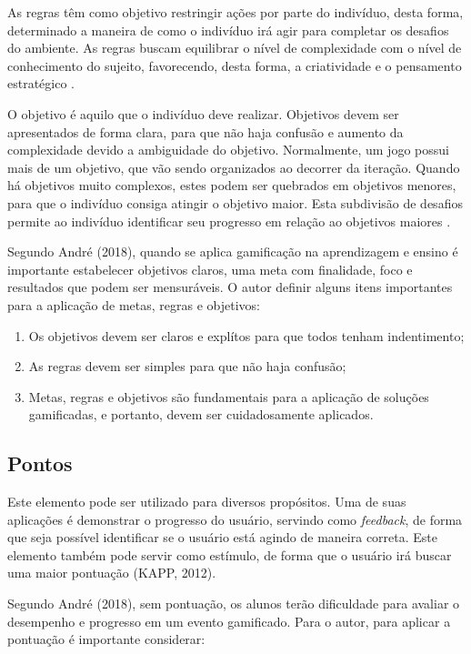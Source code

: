 \documentclass[
	12pt,				%
	oneside,			%
	a4paper,			%
	english,			%
	french,				%
	spanish,			%
	brazil,				%
	]{abntex2}
\begin{document}
As regras têm como objetivo restringir ações por parte do indivíduo, desta forma, determinado a maneira de como o indivíduo irá agir para completar os desafios do ambiente. As regras buscam equilibrar o nível de complexidade com o nível de conhecimento do sujeito, favorecendo, desta forma, a criatividade e o pensamento estratégico \cite{bunchball2016gamification}.

O objetivo é aquilo que o indivíduo deve realizar. Objetivos devem ser apresentados de forma clara, para que não haja confusão e aumento da complexidade devido a ambiguidade do objetivo. Normalmente, um jogo possui mais de um objetivo, que vão sendo organizados ao decorrer da iteração. Quando há objetivos muito complexos, estes podem ser quebrados em objetivos menores, para que o indivíduo consiga atingir o objetivo maior. Esta subdivisão de desafios permite ao indivíduo identificar seu progresso em relação ao objetivos maiores \cite{fardo2013gamificaccao}.

Segundo André (2018), quando se aplica gamificação na aprendizagem e ensino é importante estabelecer objetivos claros, uma meta com finalidade, foco e resultados que podem ser mensuráveis. O autor definir alguns itens importantes para a aplicação de metas, regras e objetivos:

\begin{enumerate}
\item Os objetivos devem ser claros e explítos para que todos tenham indentimento;
\item As regras devem ser simples para que não haja confusão;
\item Metas, regras e objetivos são fundamentais para a aplicação de soluções gamificadas, e portanto, devem ser cuidadosamente aplicados.
\end{enumerate}

\subsection{Pontos}

Este elemento pode ser utilizado para diversos propósitos. Uma de suas aplicações é demonstrar o progresso do usuário, servindo como \textit{feedback}, de forma que seja possível identificar se o usuário está agindo de maneira correta. Este elemento também pode servir como estímulo, de forma que o usuário irá buscar uma maior pontuação (KAPP, 2012). 

Segundo André (2018), sem pontuação, os alunos terão dificuldade para avaliar o desempenho e progresso em um evento gamificado. Para o autor, para aplicar a pontuação é importante considerar:
\end{document}
